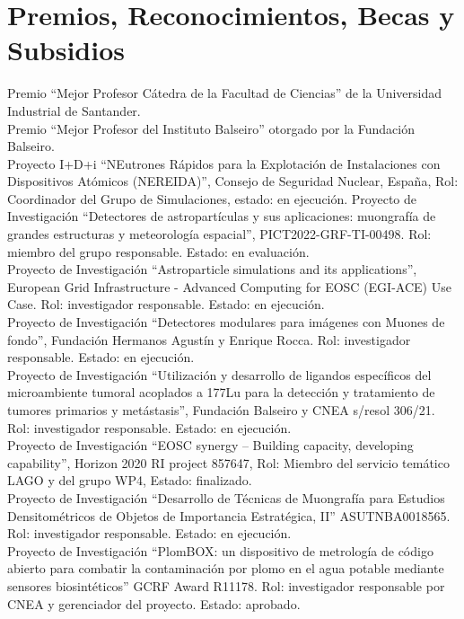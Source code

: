 \section*{Premios, Reconocimientos, Becas y Subsidios}
\noindent
{} Premio ``Mejor Profesor Cátedra de la Facultad de Ciencias'' de la Universidad Industrial de Santander.\\
 Premio ``Mejor Profesor del Instituto Balseiro'' otorgado por la Fundación Balseiro.\\
 Proyecto I+D+i ``NEutrones Rápidos para la Explotación de Instalaciones con Dispositivos Atómicos (NEREIDA)'', Consejo de Seguridad Nuclear, España, Rol: Coordinador del Grupo de Simulaciones, estado: en ejecución.
 Proyecto de Investigación ``Detectores de astropartículas y sus aplicaciones: muongrafía de grandes estructuras y meteorología espacial'', PICT2022-GRF-TI-00498. Rol: miembro del grupo responsable. Estado: en evaluación.\\
 Proyecto de Investigación ``Astroparticle simulations and its applications'', European Grid Infrastructure - Advanced Computing for EOSC (EGI-ACE) Use Case. Rol: investigador responsable. Estado: en ejecución.\\
 Proyecto de Investigación ``Detectores modulares para imágenes con Muones de fondo'', Fundación Hermanos Agustín y Enrique Rocca. Rol: investigador responsable. Estado: en ejecución.\\
 Proyecto de Investigación ``Utilización y desarrollo de ligandos específicos del microambiente tumoral acoplados a 177Lu para la detección y tratamiento de tumores primarios y metástasis'', Fundación Balseiro y CNEA s/resol 306/21. Rol: investigador responsable. Estado: en ejecución.\\
 Proyecto de Investigación ``EOSC synergy – Building capacity, developing capability'', Horizon 2020 RI project 857647, Rol: Miembro del servicio temático LAGO y del grupo WP4, Estado: finalizado.\\
 Proyecto de Investigación ``Desarrollo de Técnicas de Muongrafía para Estudios Densitométricos de Objetos de Importancia Estratégica, II'' ASUTNBA0018565. Rol: investigador responsable. Estado: en ejecución.\\
 Proyecto de Investigación ``PlomBOX: un dispositivo de metrología de código abierto para combatir la contaminación por plomo en el agua potable mediante sensores biosintéticos'' GCRF Award R11178. Rol: investigador responsable por CNEA y gerenciador del proyecto. Estado: aprobado.\\
